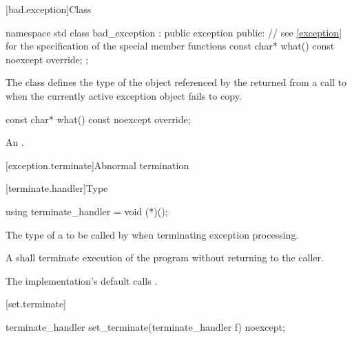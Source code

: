 [bad.exception]{Class }

%
%
\begin{codeblock}
namespace std {
  class bad_exception : public exception {
  public:
    // see \ref{exception} for the specification of the special member functions
    const char* what() const noexcept override;
  };
}
\end{codeblock}

\pnum
The class
defines the type of the object
referenced by the 
returned from a call to 
when the currently active exception object fails to copy.

%
\begin{itemdecl}
const char* what() const noexcept override;
\end{itemdecl}

\begin{itemdescr}
\pnum
\returns
An  \ntbs{}.
\end{itemdescr}

[exception.terminate]{Abnormal termination}

[terminate.handler]{Type }

%
\begin{itemdecl}
using terminate_handler = void (*)();
\end{itemdecl}

\begin{itemdescr}
\pnum
The type of a
to be called by
%
when terminating exception processing.

\pnum
\required
A  shall
terminate execution of the program without returning to the caller.

\pnum
{}
The implementation's default  calls
.%
%
\end{itemdescr}

[set.terminate]{}

%
\begin{itemdecl}
terminate_handler set_terminate(terminate_handler f) noexcept;
\end{itemdecl}

